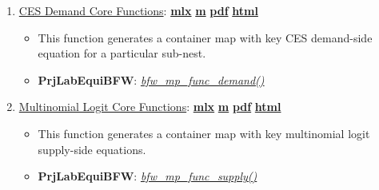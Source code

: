\documentclass[
]{book}
\providecommand{\tightlist}{%
  \setlength{\itemsep}{0pt}\setlength{\parskip}{0pt}}
\begin{document}
\begin{enumerate}
\def\labelenumi{\arabic{enumi}.}
\tightlist
\item
  \href{https://fanwangecon.github.io/PrjLabEquiBFW/PrjLabEquiBFW/doc/func/htmlpdfm/bfwx_mp_func_demand.html}{CES Demand Core Functions}: \href{https://github.com/FanWangEcon/PrjLabEquiBFW/blob/master/PrjLabEquiBFW/doc/func/bfwx_mp_func_demand.mlx}{\textbf{mlx}} \textbar{} \href{https://github.com/FanWangEcon/PrjLabEquiBFW/blob/master/PrjLabEquiBFW/doc/func/htmlpdfm/bfwx_mp_func_demand.m}{\textbf{m}} \textbar{} \href{https://github.com/FanWangEcon/PrjLabEquiBFW/blob/master/PrjLabEquiBFW/doc/func/htmlpdfm/bfwx_mp_func_demand.pdf}{\textbf{pdf}} \textbar{} \href{https://fanwangecon.github.io/PrjLabEquiBFW/PrjLabEquiBFW/doc/func/htmlpdfm/bfwx_mp_func_demand.html}{\textbf{html}}

  \begin{itemize}
  \tightlist
  \item
    This function generates a container map with key CES demand-side equation for a particular sub-nest.
  \item
    \textbf{PrjLabEquiBFW}: \emph{\href{https://github.com/FanWangEcon/PrjLabEquiBFW/blob/main/PrjLabEquiBFW/func/bfw_mp_func_demand.m}{bfw\_mp\_func\_demand()}}
  \end{itemize}
\item
  \href{https://fanwangecon.github.io/PrjLabEquiBFW/PrjLabEquiBFW/doc/func/htmlpdfm/bfwx_mp_func_supply.html}{Multinomial Logit Core Functions}: \href{https://github.com/FanWangEcon/PrjLabEquiBFW/blob/master/PrjLabEquiBFW/doc/func/bfwx_mp_func_supply.mlx}{\textbf{mlx}} \textbar{} \href{https://github.com/FanWangEcon/PrjLabEquiBFW/blob/master/PrjLabEquiBFW/doc/func/htmlpdfm/bfwx_mp_func_supply.m}{\textbf{m}} \textbar{} \href{https://github.com/FanWangEcon/PrjLabEquiBFW/blob/master/PrjLabEquiBFW/doc/func/htmlpdfm/bfwx_mp_func_supply.pdf}{\textbf{pdf}} \textbar{} \href{https://fanwangecon.github.io/PrjLabEquiBFW/PrjLabEquiBFW/doc/func/htmlpdfm/bfwx_mp_func_supply.html}{\textbf{html}}

  \begin{itemize}
  \tightlist
  \item
    This function generates a container map with key multinomial logit supply-side equations.
  \item
    \textbf{PrjLabEquiBFW}: \emph{\href{https://github.com/FanWangEcon/PrjLabEquiBFW/blob/main/PrjLabEquiBFW/func/bfw_mp_func_supply.m}{bfw\_mp\_func\_supply()}}
  \end{itemize}
\end{enumerate}
\end{document}
